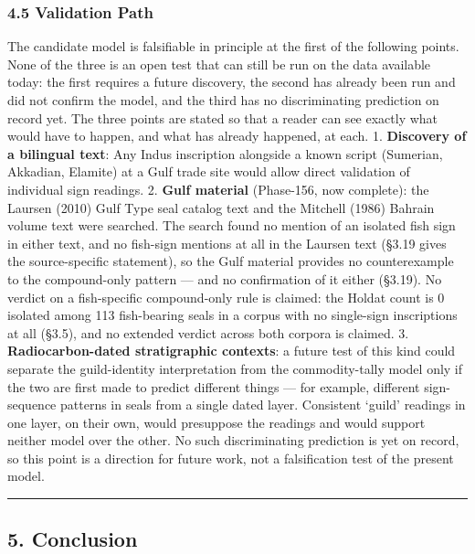 \documentclass[
]{article}
\begin{document}
\subsubsection{4.5 Validation Path}\label{validation-path}

The candidate model is falsifiable in principle at the first of the following points. None of the three is an open test that can still be run on the data available today: the first requires a future discovery, the second has already been run and did not confirm the model, and the third has no discriminating prediction on record yet. The three points are stated so that a reader can see exactly what would have to happen, and what has already happened, at each. 1. \textbf{Discovery of
a bilingual text}: Any Indus inscription alongside a known script
(Sumerian, Akkadian, Elamite) at a Gulf trade site would allow direct
validation of individual sign readings. 2. \textbf{Gulf material} (Phase-156, now complete): the Laursen (2010) Gulf Type seal catalog text and the Mitchell (1986) Bahrain volume text were searched. The search found no mention of an isolated fish sign in either text, and no fish-sign mentions at all in the Laursen text (§3.19 gives the source-specific statement), so the Gulf material provides no counterexample to the compound-only pattern --- and no confirmation of it either (§3.19). No verdict on a fish-specific compound-only rule is claimed: the Holdat count is 0 isolated among 113 fish-bearing seals in a corpus with no single-sign inscriptions at all (§3.5), and no extended verdict across both corpora is claimed. 3.
\textbf{Radiocarbon-dated stratigraphic contexts}: a future test of this kind could separate the guild-identity interpretation from the commodity-tally model only if the two are first made to predict different things --- for example, different sign-sequence patterns in seals from a single dated layer. Consistent `guild' readings in one layer, on their own, would presuppose the readings and would support neither model over the other. No such discriminating prediction is yet on record, so this point is a direction for future work, not a falsification test of the present model.

\begin{center}\rule{0.5\linewidth}{0.5pt}\end{center}

\subsection{5. Conclusion}\label{conclusion}
\end{document}
